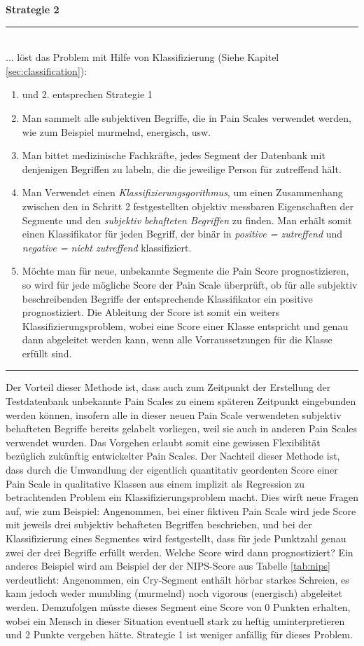 \textbf{Strategie 2} \noindent\rule{0.83\linewidth}{0.3pt} \\
... löst das Problem mit Hilfe von Klassifizierung (Siehe Kapitel \ref{sec:classification}):
\begin{enumerate}
	\item und 2. entsprechen Strategie 1
	\item Man sammelt alle subjektiven Begriffe, die in Pain Scales verwendet werden, wie zum Beispiel \glqq murmelnd\grqq , \glqq energisch\grqq , usw.
	\item Man bittet medizinische Fachkräfte, jedes Segment der Datenbank mit denjenigen Begriffen zu labeln, die die jeweilige Person für zutreffend hält. 
	\item  Man Verwendet einen \emph{Klassifizierungsgorithmus}, um einen Zusammenhang zwischen den in Schritt 2 festgestellten objektiv messbaren Eigenschaften der Segmente und den \emph{subjektiv behafteten Begriffen} zu finden. Man erhält somit einen Klassifikator für jeden Begriff, der binär in \emph{positive = zutreffend} und \emph{negative = nicht zutreffend} klassifiziert.
	\item Möchte man für neue, unbekannte Segmente die Pain Score prognostizieren, so wird für jede mögliche Score der Pain Scale überprüft, ob für alle subjektiv beschreibenden Begriffe der entsprechende Klassifikator ein positive prognostiziert. Die Ableitung der Score ist somit ein weiters Klassifizierungsproblem, wobei eine Score einer Klasse entspricht und genau dann abgeleitet werden kann, wenn alle Vorraussetzungen für die Klasse erfüllt sind.
\end{enumerate}
\noindent\rule{\linewidth}{0.3pt}

Der Vorteil dieser Methode ist, dass auch zum Zeitpunkt der Erstellung der Testdatenbank unbekannte Pain Scales zu einem späteren Zeitpunkt eingebunden werden können, insofern alle in dieser neuen Pain Scale verwendeten subjektiv behafteten Begriffe bereits gelabelt vorliegen, weil sie auch in anderen Pain Scales verwendet wurden. Das Vorgehen erlaubt somit eine gewissen Flexibilität bezüglich zukünftig entwickelter Pain Scales. Der Nachteil dieser Methode ist, dass durch die Umwandlung der eigentlich quantitativ geordenten Score einer Pain Scale in qualitative Klassen aus einem implizit als Regression zu betrachtenden Problem ein Klassifizierungsproblem macht. Dies wirft neue Fragen auf, wie zum Beispiel: Angenommen, bei einer fiktiven Pain Scale wird jede Score mit jeweils drei subjektiv behafteten Begriffen beschrieben, und bei der Klassifizierung eines Segmentes wird festgestellt, dass für jede Punktzahl genau zwei der drei Begriffe erfüllt werden. Welche Score wird dann prognostiziert? Ein anderes Beispiel wird am Beispiel der der NIPS-Score aus Tabelle \ref{tab:nips} verdeutlicht: Angenommen, ein Cry-Segment enthält hörbar \glqq starkes\grqq{} Schreien, es kann jedoch weder \glqq mumbling (murmelnd) \grqq{} noch \glqq vigorous (energisch)\grqq{} abgeleitet werden. Demzufolgen müsste dieses Segment eine Score von 0 Punkten erhalten, wobei ein Mensch in dieser Situation eventuell \glqq stark\grqq{} zu \glqq heftig\grqq{} uminterpretieren und 2 Punkte vergeben hätte. Strategie 1 ist weniger anfällig für dieses Problem.

